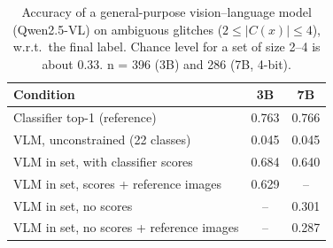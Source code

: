 \begin{table}[!htbp]
\caption{Accuracy of a general-purpose vision--language model (Qwen2.5-VL) on ambiguous glitches
($2\le|C(x)|\le4$), w.r.t.\ the final label. Chance level for a set of size 2--4 is about 0.33.
n = 396 (3B) and 286 (7B, 4-bit).}\label{tab:e5}
\centering\footnotesize\setlength{\tabcolsep}{4pt}
\begin{tabular}{lcc}\toprule
Condition & 3B & 7B\\\midrule
Classifier top-1 (reference) & 0.763 & 0.766\\
VLM, unconstrained (22 classes) & 0.045 & 0.045\\
VLM in set, with classifier scores & 0.684 & 0.640\\
VLM in set, scores + reference images & 0.629 & --\\
VLM in set, no scores & -- & 0.301\\
VLM in set, no scores + reference images & -- & 0.287\\
\bottomrule
\end{tabular}
\end{table}
